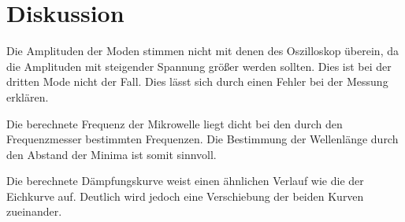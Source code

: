 \section{Diskussion}
\label{sec:Diskussion}
Die Amplituden der Moden stimmen nicht mit denen des Oszilloskop überein, da die
Amplituden mit steigender Spannung größer werden sollten. Dies ist bei der
dritten Mode nicht der Fall. Dies lässt sich durch einen Fehler bei der Messung erklären.

Die berechnete Frequenz der Mikrowelle liegt dicht bei den durch den Frequenzmesser
bestimmten Frequenzen. Die Bestimmung der Wellenlänge durch den Abstand der Minima
ist somit sinnvoll.

Die berechnete Dämpfungskurve weist einen ähnlichen Verlauf wie die der Eichkurve auf.
Deutlich wird jedoch eine Verschiebung der beiden Kurven zueinander.
